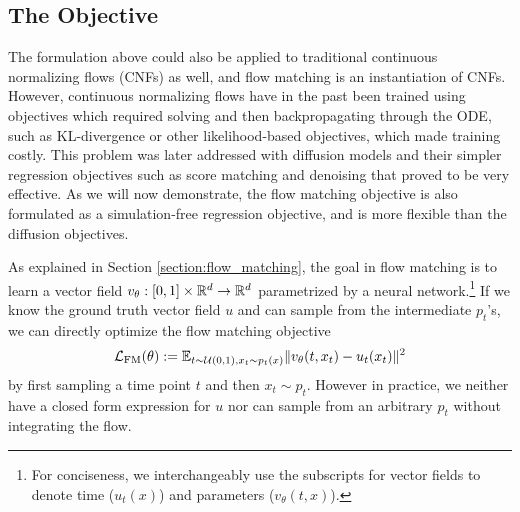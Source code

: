\subsection{The Objective}

The formulation above could also be applied to traditional continuous normalizing flows (CNFs) \citep{chenNeuralOrdinaryDifferential2018a} as well, and flow matching is an instantiation of CNFs. However, continuous normalizing flows have in the past been trained using objectives which required solving and then backpropagating through the ODE, such as KL-divergence or other likelihood-based objectives, which made training costly. This problem was later addressed with diffusion models and their simpler regression objectives such as score matching and denoising \citep{sohl-dicksteinDeepUnsupervisedLearning2015, songScoreBasedGenerativeModeling2021a,hoDenoisingDiffusionProbabilistic2020} that proved to be very effective. As we will now demonstrate, the flow matching objective is also formulated as a simulation-free regression objective, and is more flexible than the diffusion objectives. 

As explained in Section \ref{section:flow_matching}, the goal in flow matching is to learn a vector field $v_\theta: [0,1] \times \mathbb{R}^d \to \mathbb{R}^d$ parametrized by a neural network.\footnote{For conciseness, we interchangeably use the subscripts for vector fields to denote time ($u_t(x)$) and parameters ($v_\theta(t,x)$).} If we know the ground truth vector field $u$ and can sample from the intermediate $p_t$'s, we can directly optimize the flow matching objective 
\begin{equation} \label{eq:fm_objective}
    \mathcal{L}_{\text{FM}}(\theta) := \mathbb{E}_{t \sim \mathcal{U}(0,1), x_t \sim p_t(x)} \Vert v_\theta(t, x_t) - u_t(x_t) \Vert ^2
\end{equation}
by first sampling a time point $t$ and then $x_t \sim p_t$. However in practice, we neither have a closed form expression for $u$ nor can sample from an arbitrary $p_t$ without integrating the flow. 

